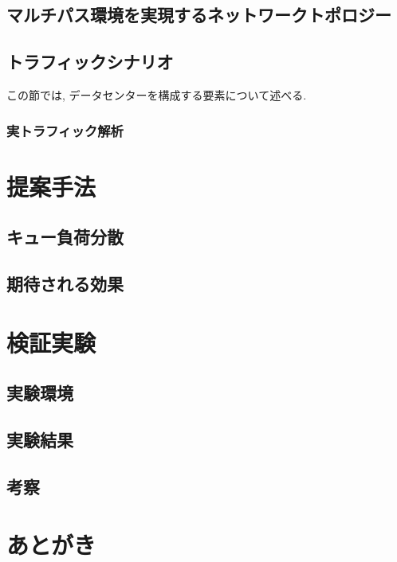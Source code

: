 \documentclass[11pt, a4paper, twocolumn]{jsarticle}
\begin{document}
\subsection{マルチパス環境を実現するネットワークトポロジー}

\subsection{トラフィックシナリオ}
\label{sec:fattree}
この節では, データセンターを構成する要素について述べる.
\subsubsection{実トラフィック解析}
\label{sec:traffic_character}

\section{提案手法}
\label{sec:proposed_method}

\subsection{キュー負荷分散}
\label{sec:load_balancing_mechanism}

\subsection{期待される効果}
\label{sec:expected_effect}


\section{検証実験}
\label{sec:verification}

\subsection{実験環境}


\subsection{実験結果}

\subsection{考察}
\label{sec:analysis}

\section{あとがき}
\label{sec:conclude}
\end{document}
